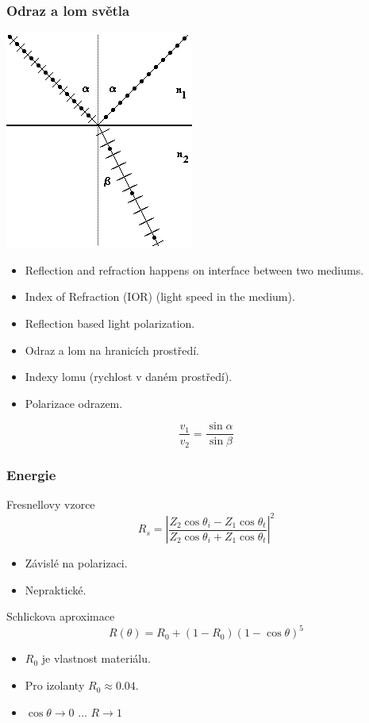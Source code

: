 \begin{frame}\frametitle{Odraz a lom světla}
  \includegraphics[width=.3\textwidth]{pics/physicallyBasedRendering/image106}
  \scriptsize
  \begin{itemize}
    \item Reflection and refraction happens on interface between two mediums.
    \item Index of Refraction (IOR) (light speed in the medium).
    \item Reflection based light polarization.
  \end{itemize}
  \begin{itemize}
    \item Odraz a lom na hranicích prostředí.
    \item Indexy lomu (rychlost v daném prostředí).
    \item Polarizace odrazem.
  \end{itemize}
  \begin{equation*}
    \frac{v_1}{v_2} = \frac{\sin\alpha}{\sin\beta}
  \end{equation*}
\end{frame}

\begin{frame}
    \frametitle{Energie}
    Fresnellovy vzorce
    \begin{equation*}
        R_s = \left| \frac{Z_2 \cos \theta_i - Z_1 \cos \theta_t}{Z_2 \cos \theta_i + Z_1 \cos \theta_t} \right|^2
    \end{equation*}
    \begin{itemize}
        \item Závislé na polarizaci.
        \item Nepraktické.
    \end{itemize}
    \pause\vfill
    Schlickova aproximace
    \begin{equation*}
        R(\theta) = R_0 + (1-R_0)(1-\cos\theta)^5
    \end{equation*}
    \begin{itemize}
        \item $R_0$ je vlastnost materiálu.
        \item Pro izolanty $R_0 \approx 0.04$.
        \item $\cos\theta \rightarrow 0$ ... $R \rightarrow 1$
    \end{itemize}
\end{frame}

